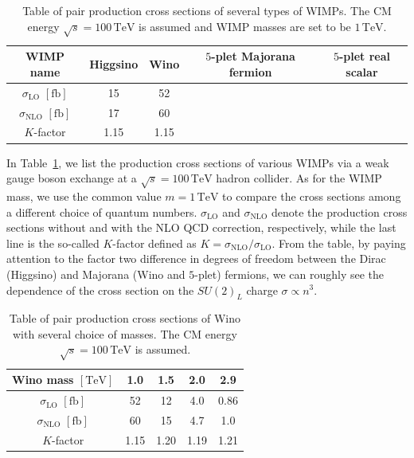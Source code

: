 \documentclass[12pt,twoside,book]{article}
\begin{document}
\begin{table}[t]
  \centering
  \begin{tabular}{c|cccc}
    WIMP name & Higgsino & Wino & $5$-plet Majorana fermion & $5$-plet real scalar \\ \hline
    $\sigma_{\mathrm{LO}}$ $[\mathrm{fb}]$ & 15 & 52 & \rem{???} & \rem{???} \\
    $\sigma_{\mathrm{NLO}}$ $[\mathrm{fb}]$ & 17 & 60 & \rem{???} & \rem{???} \\ \hline
    $K$-factor & 1.15 & 1.15 & &
  \end{tabular}
  \caption{
    Table of pair production cross sections of several types of WIMPs.
    The CM energy $\sqrt{s} = 100\,\mathrm{TeV}$ is assumed and WIMP masses are set to be $1\,\mathrm{TeV}$.
  }
  \label{tab:cross_section_WIMPs}
\end{table}

In Table~\ref{tab:cross_section_WIMPs}, we list the production cross sections of various WIMPs via a weak gauge boson exchange at a $\sqrt{s} = 100\,\mathrm{TeV}$ hadron collider.
As for the WIMP mass, we use the common value $m = 1\,\mathrm{TeV}$ to compare the cross sections among a different choice of quantum numbers.
$\sigma_{\mathrm{LO}}$ and $\sigma_{\mathrm{NLO}}$ denote the production cross sections without and with the NLO QCD correction, respectively, while the last line is the so-called $K$-factor defined as $K = \sigma_{\mathrm{NLO}} / \sigma_{\mathrm{LO}}$.
From the table, by paying attention to the factor two difference in degrees of freedom between the Dirac (Higgsino) and Majorana (Wino and $5$-plet) fermions, we can roughly see the dependence of the cross section on the $SU(2)_L$ charge $\sigma \propto n^3$.


\begin{table}[t]
  \centering
  \begin{tabular}{c|cccc}
    Wino mass $\mathrm{[TeV]}$ & 1.0 & 1.5 & 2.0 & 2.9 \\ \hline
    $\sigma_{\mathrm{LO}}$ $[\mathrm{fb}]$ & 52 & 12 & 4.0 & 0.86\\
    $\sigma_{\mathrm{NLO}}$ $[\mathrm{fb}]$ & 60 & 15 & 4.7 & 1.0 \\ \hline
    $K$-factor & 1.15 & 1.20 & 1.19 & 1.21
  \end{tabular}
  \caption{
    Table of pair production cross sections of Wino with several choice of masses.
    The CM energy $\sqrt{s} = 100\,\mathrm{TeV}$ is assumed.
  }
  \label{tab:cross_section_Wino_mass}
\end{table}
\end{document}
